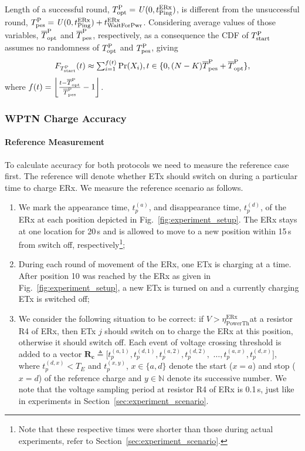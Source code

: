 \documentclass[11pt,draftclsnofoot,journal,onecolumn]{IEEEtran}
\newcommand{\rxVoltageThreshold}{$\eta^\text{ERx}_\text{PowerTh}$}
\begin{document}
Length of a successful round, $T^{\text{P}}_{\text{opt}} = \mathit{U}(0, t^\text{ERx}_\text{Ping})$, is different from the unsuccessful round, $T^{\text{P}}_{\text{pes}} = \mathit{U}(0, t^\text{ERx}_\text{Ping}) + t^\text{ERx}_\text{WaitForPwr}$. Considering average values of those variables, $\overline{T}^{\text{P}}_{\text{opt}}$ and $\overline{T}^{\text{P}}_{\text{pes}}$, respectively, as a consequence the CDF of $T^{\text{P}}_{\text{start}}$ assumes no randomness of $T^{\text{P}}_{\text{opt}}$ and $T^{\text{P}}_{\text{pes}}$, giving
\begin{equation}
F_{T^{\text{P}}_{\text{start}}}(t) \approx \textstyle \sum_{i = 1}^{f(t)} \Pr(X_i), t \in \{0, (N-K) \overline{T}^{\text{P}}_{\text{pes}} + \overline{T}^{\text{P}}_{\text{opt}}\},
\end{equation}
where $f(t) = \left\lfloor \frac{ t - \overline{T}^{\text{P}}_{\text{opt}}}{ \overline{T}^{\text{P}}_{\text{pes}}} - 1 \right\rfloor$.

\subsubsection{WPTN Charge Accuracy}
\label{sec:charge_accuracy_metric}

\paragraph{Reference Measurement}

To calculate accuracy for both protocols we need to measure the reference case first. The reference will denote whether ETx should switch on during a particular time to charge ERx. We measure the reference scenario as follows.
\begin{enumerate}
\item We mark the appearance time, $t^{(a)}_{p}$, and disappearance time, $t^{(d)}_{p}$, of the ERx at each position depicted in Fig.~\ref{fig:experiment_setup}. The ERx stays at one location for 20\,s and is allowed to move to a new position within 15\,s from switch off, respectively\footnote{Note that these respective times were shorter than those during actual experiments, refer to Section~\ref{sec:experiment_scenario}.};
\item During each round of movement of the ERx, one ETx is charging at a time. After position 10 was reached by the ERx as given in Fig.~\ref{fig:experiment_setup}, a new ETx is turned on and a currently charging ETx is switched off;
\item We consider the following situation to be correct: if $V>$\rxVoltageThreshold at a resistor R4 of ERx, then ETx $j$ should switch on to charge the ERx at this position, otherwise it should switch off. Each event of voltage crossing threshold is added to a vector $\mathbf{R_c}\triangleq [t^{(a,1)}_{p}, t^{(d,1)}_{p}, t^{(a,2)}_{p}, t^{(d,2)}_{p},$ $\ldots,t^{(a,x)}_{p}, t^{(d,x)}_{p}]$, where $t^{(d,x)}_{p}<T_{E}$ and $t^{(x,y)}_{p}$, $x\in\{a,d\}$ denote the start ($x=a$) and stop ($x=d$) of the reference charge and $y\in \mathbb{N}$ denote its successive number. We note that the voltage sampling period at resistor R4 of ERx is 0.1\,s, just like in experiments in Section~\ref{sec:experiment_scenario}.
\end{enumerate}
\end{document}
